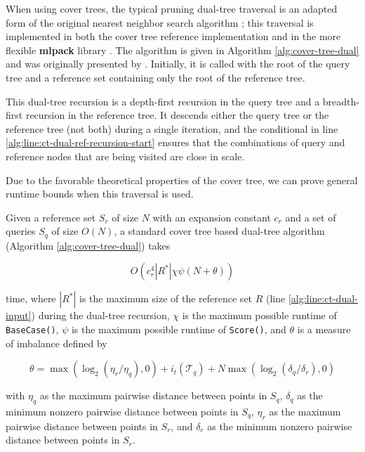 When using cover trees, the typical pruning dual-tree traversal is an adapted
form of the original nearest neighbor search algorithm \citep[see
\texttt{Find-All-Nearest},][]{langford2006}; this traversal is implemented in
both the cover tree reference implementation and in the more flexible {\bf
mlpack} library \citep{mlpack2013}.  The algorithm is given in Algorithm
\ref{alg:cover-tree-dual} and was originally presented by
\citet{curtin2014dual}.  Initially, it is called with the root of the query tree
and a reference set containing only the root of the reference tree.

This dual-tree recursion is a depth-first recursion in the query tree and a
breadth-first recursion in the reference tree.  It descends either the query
tree or the reference tree (not both) during a single iteration, and the
conditional in line \ref{alg:line:ct-dual-ref-recursion-start} ensures that the
combinations of query and reference nodes that are being visited are close in
scale.

Due to the favorable theoretical properties of the cover tree, we can prove
general runtime bounds when this traversal is used.

\begin{thm}
\label{thm:ct-runtime}
Given a reference set $S_r$ of size $N$ with an expansion constant $c_r$ and a
set of queries $S_q$ of size $O(N)$, a standard cover tree based dual-tree
algorithm (Algorithm \ref{alg:cover-tree-dual}) takes

\begin{equation}
O\left(c_r^4 | R^* | \chi \psi (N + \theta)\right)
\end{equation}

\noindent time, where $ | R^* | $ is the maximum size of the reference set $R$
(line \ref{alg:line:ct-dual-input}) during the dual-tree recursion, $\chi$ is
the maximum possible runtime of \texttt{BaseCase()}, $\psi$ is the maximum
possible runtime of \texttt{Score()}, and $\theta$ is a measure of imbalance
defined by

\begin{equation}
\theta = \max(\log_2(\eta_r / \eta_q), 0) + i_t(\mathscr{T}_q) + N
\max(\log_2(\delta_q / \delta_r), 0)
\end{equation}

\noindent with $\eta_q$ as the maximum pairwise distance between points in
$S_q$, $\delta_q$ as the minimum nonzero pairwise distance between points in
$S_q$, $\eta_r$ as the maximum pairwise distance between points in $S_r$, and
$\delta_r$ as the minimum nonzero pairwise distance between points in $S_r$.
\end{thm}


